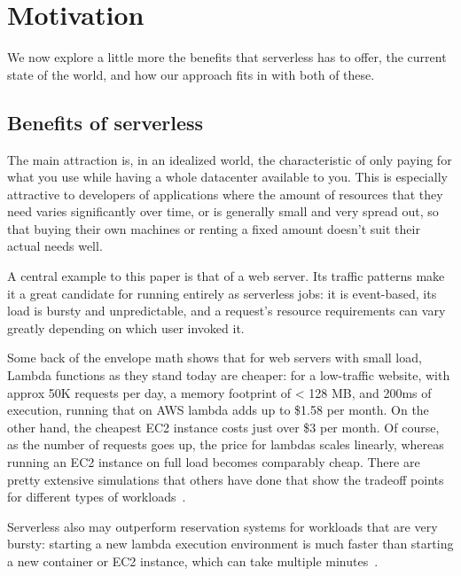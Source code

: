 \section{Motivation}\label{motivation}

We now explore a little more the benefits that serverless has to offer, the
current state of the world, and how our approach fits in with both of these.

\subsection{Benefits of serverless}

The main attraction is, in an idealized world, the characteristic of only paying
for what you use while having a whole datacenter available to you. This is
especially attractive to developers of applications where the amount of
resources that they need varies significantly over time, or is generally small
and very spread out, so that buying their own machines or renting a fixed amount
doesn't suit their actual needs well.

A central example to this paper is that of a web server. Its traffic patterns
make it a great candidate for running entirely as serverless jobs: it is
event-based, its load is bursty and unpredictable, and a request's resource
requirements can vary greatly depending on which user invoked it.


Some back of the envelope math shows that for web servers with small load,
Lambda functions as they stand today are cheaper: for a low-traffic website,
with approx 50K requests per day, a memory footprint of < 128 MB, and 200ms of
execution, running that on AWS lambda adds up to \$1.58 per month. On the other
hand, the cheapest EC2 instance costs just over \$3 per month. Of course, as the
number of requests goes up, the price for lambdas scales linearly, whereas
running an EC2 instance on full load becomes comparably cheap. There are pretty
extensive simulations that others have done that show the tradeoff points for
different types of workloads~\cite{econ-of-serverless,trek10-blog}.

Serverless also may outperform reservation systems for workloads that are very
bursty: starting a new lambda execution environment is much faster than starting
a new container or EC2 instance, which can take multiple
minutes~\cite{ec2-autoscaling}.



